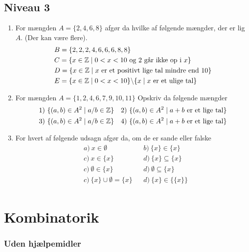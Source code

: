 \newpage
\subsection*{Niveau 3}
\begin{enumerate}[label=\roman*)]
	\item For mængden $A = \{2,4,6,8\}$ afgør da hvilke af følgende mængder, der er lig $A$. (Der kan være flere).
	\begin{align*}
		&B = \{2,2,2,4,6,6,6,8,8\} \\
		&C = \{x \in \mathbb{Z} \mid 0 < x < 10 \textnormal{ og 2 går ikke op i }x \}\\
		&D = \{x \in \mathbb{Z} \mid x \textnormal{ er et positivt lige tal mindre end 10}\} \\
		&E= \{x \in \mathbb{Z} \mid 0 < x < 10 \} \backslash \{x \mid x \textnormal{ er et ulige tal}\}
	\end{align*}	
	\item For mængden $A = \{1,2,4,6,7,9,10,11\}$ Opskriv da følgende mængder
	\begin{align*}
		&1) \ \{(a,b) \in A^2 \mid a/b \in \mathbb{Z}\}  & &2) \   \{(a,b) \in A^2 \mid a + b \textnormal{ er et lige tal}\} \\
		&3) \ \{(a,b) \in A^2 \mid a/b \in \mathbb{Z}\}  & &4) \   \{(a,b) \in A^2 \mid a + b \textnormal{ er et lige tal}\}
	\end{align*}
	\item For hvert af følgende udsagn afgør da, om de er sande eller falske 
	\begin{align*}
		&a) \ x \in \emptyset   &&b) \ \{x\} \in \{x\} \\
		&c) \ x \in \{x\}      &&d) \  \{x\} \subseteq \{x\} \\
		&c) \ \emptyset \in \{x\}      &&d) \  \emptyset \subseteq \{x\} \\
		&c) \ \{x\} \cup \emptyset = \{x\}      &&d) \  \{x\} \in \{\{x\}\} \\
	\end{align*}
\end{enumerate}

\newpage

\section*{Kombinatorik}

\subsubsection*{Uden hjælpemidler}

